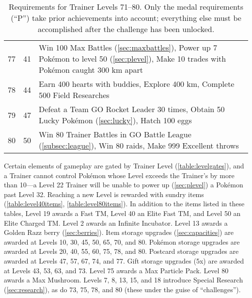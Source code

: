 \begin{table}
\begin{tabular}{rrp{}}
  77 & 41 & Win 100 Max Battles (\autoref{sec:maxbattles}),\newline
  Power up 7 Pokémon to level 50 (\autoref{sec:plevel}),\newline
  Make 10 trades with Pokémon caught 300 km apart\\
\rowcolor{Gray!25}
  78 & 44 & Earn 400 hearts with buddies,\newline
  Explore 400 km,\newline
  Complete 500 Field Researches\\
  79 & 47 & Defeat a Team GO Rocket Leader 30 times,\newline
  Obtain 50 Lucky Pokémon (\autoref{sec:lucky}),\newline
  Hatch 100 eggs\\
\rowcolor{Gray!25}
  80 & 50 & Win 80 Trainer Battles in GO Battle League (\autoref{subsec:league}),\newline
  Win 80 raids,\newline
  Make 999 Excellent throws\\
\end{tabular}
\caption[Requirements for Trainer Levels 71--80]{Requirements for Trainer Levels 71--80.
   Only the medal requirements (``P'') take prior achievements into account; everything else
   must be accomplished after the challenge has been unlocked.\label{table:xp71plus}}
\end{table}
Certain elements of gameplay are gated by Trainer Level (\autoref{table:levelgates}),
  and a Trainer cannot control Pokémon whose Level exceeds the Trainer's
  by more than 10---a Level 22 Trainer will be unable to power up (\autoref{sec:plevel}) a Pokémon past Level 32.
Reaching a new Level is rewarded with sundry items (\autoref{table:level40items}, \autoref{table:level80items}).
In addition to the items listed in these tables, Level 19 awards a Fast TM, Level 40 an Elite Fast TM, and Level 50 an Elite Charged TM.
Level 2 awards an Infinite Incubator.
Level 13 awards a Golden Razz berry (\autoref{sec:berries}).
Item storage upgrades (\autoref{sec:capacities}) are awarded at Levels 10, 30, 45, 50, 65, 70, and 80.
Pokémon storage upgrades are awarded at Levels 20, 40, 55, 60, 75, 78, and 80.
Postcard storage upgrades are awarded at Levels 47, 57, 67, 74, and 77.
Gift storage upgrades (5x) are awarded at Levels 43, 53, 63, and 73.
Level 75 awards a Max Particle Pack.
Level 80 awards a Max Mushroom.
Levels 7, 8, 13, 15, and 18 introduce Special Research (\autoref{sec:research}), as do
 73, 75, 78, and 80 (these under the guise of ``challenges'').
